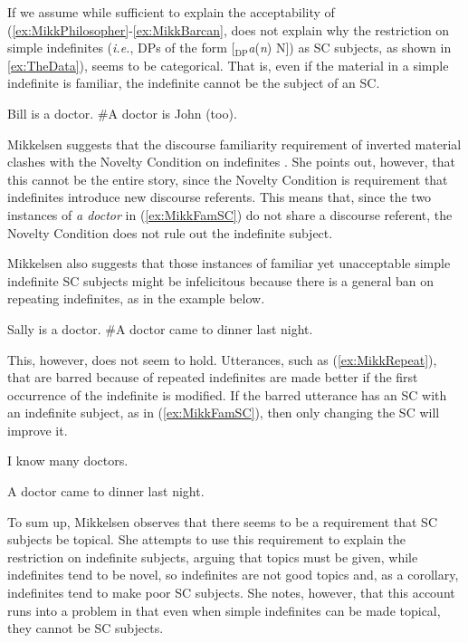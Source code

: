 \documentclass[
	letterpaper,
]{article}
\begin{document}
If we assume while sufficient to explain the acceptability of (\ref{ex:MikkPhilosopher}-\ref{ex:MikkBarcan}, does not explain why the restriction on simple indefinites (\textit{i.e.}, DPs of the form [$_\text{DP}$\textit{a}(\textit{n}) N]) as SC subjects, as shown in \ref{ex:TheData}), seems to be categorical.
That is, even if the material in a simple indefinite is familiar, the indefinite cannot be the subject of an SC.
\begin{exe}
	\ex\label{ex:MikkFamSC} Bill is a doctor. \#A doctor is John (too).
\end{exe}
Mikkelsen suggests that the discourse familiarity requirement of inverted material clashes with the Novelty Condition on indefinites \parencite{heim1982semantics}.
She points out, however, that this cannot be the entire story, since the Novelty Condition is requirement that indefinites introduce new discourse referents.
This means that, since the two instances of \textit{a doctor} in (\ref{ex:MikkFamSC}) do not share a discourse referent, the Novelty Condition does not rule out the indefinite subject.

Mikkelsen also suggests that those instances of familiar yet unacceptable simple indefinite SC subjects might be infelicitous because there is a general ban on repeating indefinites, as in the example below.
\begin{exe}
	\ex\label{ex:MikkRepeat} Sally is a doctor. \#A doctor came to dinner last night.
\end{exe}
This, however, does not seem to hold.
Utterances, such as (\ref{ex:MikkRepeat}), that are barred because of repeated indefinites are made better if the first occurrence of the indefinite is modified.
If the barred utterance has an SC with an indefinite subject, as in (\ref{ex:MikkFamSC}), then only changing the SC will improve it.
\begin{exe}
\ex\label{ex:IndefGiven} I know many doctors.
\begin{xlist}
	\ex A doctor came to dinner last night.
\end{xlist}
\end{exe}
To sum up, Mikkelsen observes that there seems to be a requirement that SC subjects be topical.
She attempts to use this requirement to explain the restriction on indefinite subjects, arguing that topics must be given, while indefinites tend to be novel, so indefinites are not good topics and, as a corollary, indefinites tend to make poor SC subjects.
She notes, however, that this account runs into a problem in that even when simple indefinites can be made topical, they cannot be SC subjects.
\end{document}

